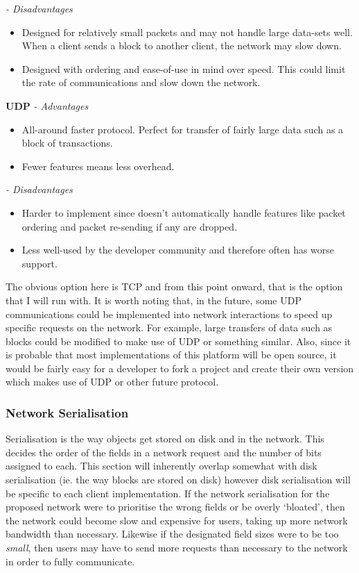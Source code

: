\documentclass{article}
\begin{document}
\textit{ - Disadvantages}
\begin{itemize}
    \item Designed for relatively small packets and may not handle large data-sets well. When a client sends a block to another client, the network may slow down.
    \item Designed with ordering and ease-of-use in mind over speed. This could limit the rate of communications and slow down the network.
\end{itemize}


\textbf{UDP}
\textit{ - Advantages}
\begin{itemize}
    \item All-around faster protocol. Perfect for transfer of fairly large data such as a block of transactions.
    \item Fewer features means less overhead.
\end{itemize}

\textit{ - Disadvantages}
\begin{itemize}
    \item Harder to implement since doesn't automatically handle features like packet ordering and packet re-sending if any are dropped.
    \item Less well-used by the developer community and therefore often has worse support.
\end{itemize}

The obvious option here is TCP and from this point onward, that is the option that I will run with. It is worth noting that, in the future, some UDP communications could be implemented into network interactions to speed up specific requests on the network. For example, large transfers of data such as blocks could be modified to make use of UDP or something similar. Also, since it is probable that most implementations of this platform will be open source, it would be fairly easy for a developer to fork a project and create their own version which makes use of UDP or other future protocol.

\subsubsection{Network Serialisation}
Serialisation is the way objects get stored on disk and in the network. This decides the order of the fields in a network request and the number of bits assigned to each. This section will inherently overlap somewhat with disk serialisation (ie. the way blocks are stored on disk) however disk serialisation will be specific to each client implementation. If the network serialisation for the proposed network were to prioritise the wrong fields or be overly `bloated', then the network could become slow and expensive for users, taking up more network bandwidth than necessary. Likewise if the designated field sizes were to be too \textit{small}, then users may have to send more requests than necessary to the network in order to fully communicate.
\end{document}
